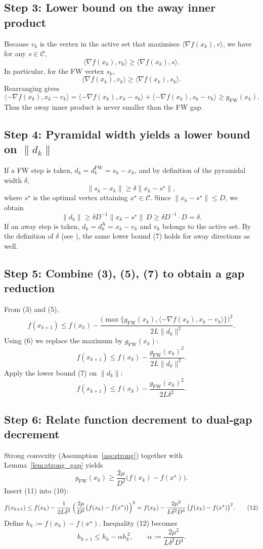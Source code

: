 \documentclass{article}
\begin{document}
\subsection*{Step 3: Lower bound on the away inner product}
Because $v_k$ is the vertex in the active set that maximises $\langle\nabla f(x_k),v\rangle$, we have for any $s\in\mathcal C$,
\[
\langle\nabla f(x_k),v_k\rangle\ge\langle\nabla f(x_k),s\rangle .
\]
In particular, for the FW vertex $s_k$,
\[
\langle\nabla f(x_k),v_k\rangle\ge\langle\nabla f(x_k),s_k\rangle .
\]
Rearranging gives
\[
\langle-\nabla f(x_k),x_k-v_k\rangle
   =\langle-\nabla f(x_k),x_k-s_k\rangle
     +\langle-\nabla f(x_k),s_k-v_k\rangle
   \ge g_{\text{FW}}(x_k). \tag{6}
\]
Thus the away inner product is never smaller than the FW gap.

\subsection*{Step 4: Pyramidal width yields a lower bound on $\|d_k\|$}
If a FW step is taken, $d_k=d_k^{\text{FW}}=s_k-x_k$, and by definition of the pyramidal width $\delta$,
\[
\|s_k-x_k\|\ge\delta\|x_k-s^\star\|,
\]
where $s^\star$ is the optimal vertex attaining $x^\star\in\mathcal C$.  Since $\|x_k-s^\star\|\le D$, we obtain
\[
\|d_k\|\ge\delta D^{-1}\|x_k-s^\star\|\,D\ge\delta D^{-1}\cdot D =\delta .\tag{7}
\]
If an away step is taken, $d_k=d_k^{\text{A}}=x_k-v_k$ and $v_k$ belongs to the active set.  By the definition of $\delta$ (see \cite{lacoste2015linear}), the same lower bound (7) holds for away directions as well.

\subsection*{Step 5: Combine (3), (5), (7) to obtain a gap reduction}
From (3) and (5),
\[
f(x_{k+1})\le f(x_k)-\frac{\bigl(\max\{g_{\text{FW}}(x_k),\langle-\nabla f(x_k),x_k-v_k\rangle\}\bigr)^2}
                        {2L\|d_k\|^2}. \tag{8}
\]
Using (6) we replace the maximum by $g_{\text{FW}}(x_k)$:
\[
f(x_{k+1})\le f(x_k)-\frac{g_{\text{FW}}(x_k)^2}{2L\|d_k\|^2}. \tag{9}
\]
Apply the lower bound (7) on $\|d_k\|$:
\[
f(x_{k+1})\le f(x_k)-\frac{g_{\text{FW}}(x_k)^2}{2L\delta^2}. \tag{10}
\]

\subsection*{Step 6: Relate function decrement to dual‑gap decrement}
Strong convexity (Assumption~\ref{ass:strong}) together with Lemma~\ref{lem:strong_gap} yields
\[
g_{\text{FW}}(x_k)\ge \frac{2\mu}{D^2}\bigl(f(x_k)-f(x^\star)\bigr). \tag{11}
\]
Insert (11) into (10):
\[
f(x_{k+1})\le f(x_k)-\frac{1}{2L\delta^2}\,
                \Bigl(\frac{2\mu}{D^2}\bigl(f(x_k)-f(x^\star)\bigr)\Bigr)^2
          = f(x_k)-\frac{2\mu^2}{L\delta^2 D^4}\,
                \bigl(f(x_k)-f(x^\star)\bigr)^2 . \tag{12}
\]
Define $h_k:=f(x_k)-f(x^\star)$.  Inequality (12) becomes
\[
h_{k+1}\le h_k-\alpha h_k^{\,2},\qquad
\alpha:=\frac{2\mu^2}{L\delta^2 D^4}. \tag{13}
\]
\end{document}
